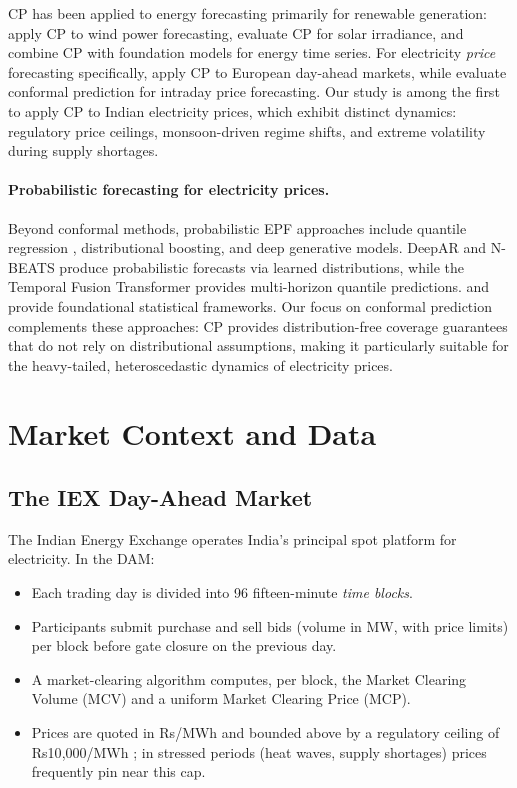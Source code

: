 \documentclass[preprint,12pt]{elsarticle}
\newcommand{\Rs}{Rs}
\begin{document}
\begin{enumerate}
CP has been applied to energy forecasting primarily for renewable generation: \citet{bera2024} apply CP to wind power forecasting, \citet{zhang2025conformal} evaluate CP for solar irradiance, and \citet{tagasovska2025} combine CP with foundation models for energy time series. For electricity \emph{price} forecasting specifically, \citet{pinson2025} apply CP to European day-ahead markets, while \citet{wang2025} evaluate conformal prediction for intraday price forecasting. Our study is among the first to apply CP to Indian electricity prices, which exhibit distinct dynamics: regulatory price ceilings, monsoon-driven regime shifts, and extreme volatility during supply shortages.

\paragraph{Probabilistic forecasting for electricity prices.}
Beyond conformal methods, probabilistic EPF approaches include quantile regression \citep{nowotarski2018}, distributional boosting, and deep generative models. DeepAR \citep{salinas2020} and N-BEATS \citep{oreshkin2020} produce probabilistic forecasts via learned distributions, while the Temporal Fusion Transformer \citep{lim2021tft} provides multi-horizon quantile predictions. \citet{box2015} and \citet{hyndman2006b} provide foundational statistical frameworks. Our focus on conformal prediction complements these approaches: CP provides distribution-free coverage guarantees that do not rely on distributional assumptions, making it particularly suitable for the heavy-tailed, heteroscedastic dynamics of electricity prices.

\section{Market Context and Data}\label{sec:data}

\subsection{The IEX Day-Ahead Market}\label{sec:market}

The Indian Energy Exchange operates India's principal spot platform for electricity. In the DAM:
\begin{itemize}
  \item Each trading day is divided into 96 fifteen-minute \emph{time blocks}.
  \item Participants submit purchase and sell bids (volume in MW, with price limits) per block before gate closure on the previous day.
  \item A market-clearing algorithm computes, per block, the Market Clearing Volume (MCV) and a uniform Market Clearing Price (MCP).
  \item Prices are quoted in \Rs/MWh and bounded above by a regulatory ceiling of \Rs10{,}000/MWh \citep{cerc}; in stressed periods (heat waves, supply shortages) prices frequently pin near this cap.
\end{itemize}


\end{enumerate}
\end{document}
